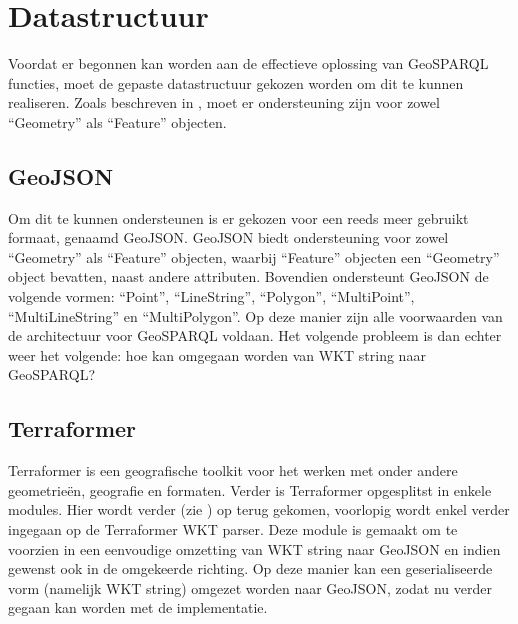 \section{Datastructuur}
\label{sec:datastructuur}
Voordat er begonnen kan worden aan de effectieve oplossing van GeoSPARQL functies, moet de gepaste datastructuur gekozen worden om dit te kunnen realiseren. Zoals beschreven in , moet er ondersteuning zijn voor zowel ``Geometry'' als ``Feature'' objecten. 

\subsection{GeoJSON}
Om dit te kunnen ondersteunen is er gekozen voor een reeds meer gebruikt formaat, genaamd GeoJSON. GeoJSON biedt ondersteuning voor zowel ``Geometry'' als ``Feature'' objecten, waarbij ``Feature'' objecten een ``Geometry'' object bevatten, naast andere attributen. Bovendien ondersteunt GeoJSON de volgende vormen: ``Point'', ``LineString'', ``Polygon'', ``MultiPoint'', ``MultiLineString'' en ``MultiPolygon''. Op deze manier zijn alle voorwaarden van de architectuur voor GeoSPARQL voldaan. Het volgende probleem is dan echter weer het volgende: hoe kan omgegaan worden van WKT string naar GeoSPARQL?

\subsection{Terraformer}
Terraformer is een geografische toolkit voor het werken met onder andere geometrieën, geografie en formaten. Verder is Terraformer opgesplitst in enkele modules. Hier wordt verder (zie ) op terug gekomen, voorlopig wordt enkel verder ingegaan op de Terraformer WKT parser. Deze module is gemaakt om te voorzien in een eenvoudige omzetting van WKT string naar GeoJSON en indien gewenst ook in de omgekeerde richting. Op deze manier kan een geserialiseerde vorm (namelijk WKT string) omgezet worden naar GeoJSON, zodat nu verder gegaan kan worden met de implementatie. 



